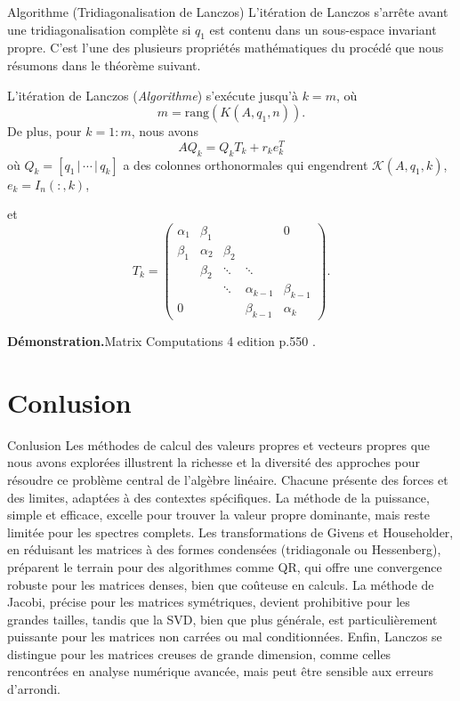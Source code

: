 \documentclass[french, 10pt]{beamer}
\theoremstyle{definition}
\begin{document}
\begin{frame}{Algorithme (Tridiagonalisation de Lanczos)}
	L’itération de Lanczos s’arrête avant une tridiagonalisation complète si \( q_1 \) est contenu dans un sous-espace invariant propre. C’est l’une des plusieurs propriétés mathématiques du procédé que nous résumons dans le théorème suivant. 
\end{frame}
\begin{frame}
	\begin{theorem}
		L'itération de Lanczos (\textit{Algorithme}) s'exécute jusqu’à \( k = m \), où
		\[
		m = \text{rang}(K(A, q_1, n)).
		\]
		De plus, pour \( k = 1:m \), nous avons
		\[
		AQ_k = Q_k T_k + r_k e_k^T 
		\]
		où \( Q_k = [q_1 \,|\, \cdots \,|\, q_k] \) a des colonnes orthonormales qui engendrent \( \mathcal{K}(A, q_1, k) \), \( e_k = I_n(:,k) \),
		
		
		et
		\[
		T_k =
		\begin{pmatrix}
			\alpha_1 & \beta_1 & & & 0 \\
			\beta_1 & \alpha_2 & \beta_2 & & \\
			& \beta_2 & \ddots & \ddots & \\
			& & \ddots & \alpha_{k-1} & \beta_{k-1} \\
			0 & & & \beta_{k-1} & \alpha_k
		\end{pmatrix}.
		\]
	\end{theorem}
	\textbf{Démonstration.}Matrix Computations 4 edition p.550 .
\end{frame}
\section{Conlusion}
\begin{frame}{Conlusion}
	Les méthodes de calcul des valeurs propres et vecteurs propres que nous avons explorées illustrent la richesse et la diversité des approches pour résoudre ce problème central de l’algèbre linéaire. Chacune présente des forces et des limites, adaptées à des contextes spécifiques. La méthode de la puissance, simple et efficace, excelle pour trouver la valeur propre dominante, mais reste limitée pour les spectres complets. Les transformations de Givens et Householder, en réduisant les matrices à des formes condensées (tridiagonale ou Hessenberg), préparent le terrain pour des algorithmes comme QR, qui offre une convergence robuste pour les matrices denses, bien que coûteuse en calculs. La méthode de Jacobi, précise pour les matrices symétriques, devient prohibitive pour les grandes tailles, tandis que la SVD, bien que plus générale, est particulièrement puissante pour les matrices non carrées ou mal conditionnées. Enfin, Lanczos se distingue pour les matrices creuses de grande dimension, comme celles rencontrées en analyse numérique avancée, mais peut être sensible aux erreurs d’arrondi.
\end{frame}
\end{document}
